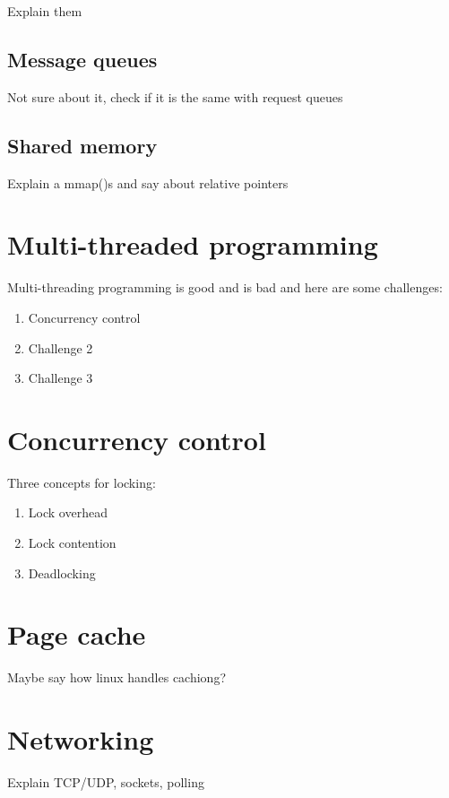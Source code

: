 Explain them


\subsection{Message queues}

Not sure about it, check if it is the same with request queues

\subsection{Shared memory}

Explain a mmap()s and say about relative pointers

\section{Multi-threaded programming}


Multi-threading programming is good and is bad and here are some challenges:

\begin{enumerate}
	\item Concurrency control
	\item Challenge 2
	\item Challenge 3
\end{enumerate}

\section{Concurrency control}


Three concepts for locking:

\begin{enumerate}
	\item Lock overhead
	\item Lock contention
	\item Deadlocking
\end{enumerate}

\section{Page cache}

Maybe say how linux handles cachiong?

\section{Networking}

Explain TCP/UDP, sockets, polling
